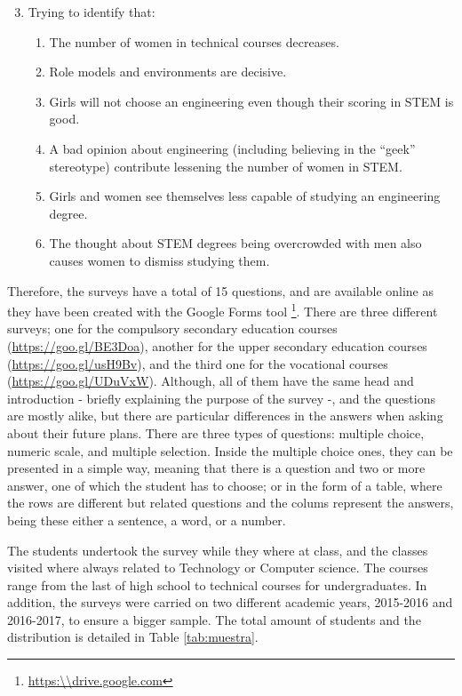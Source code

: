 \documentclass[journal,transmag]{IEEEtran}
\begin{document}
\begin{enumerate}
  \setcounter{enumi}{2}
  \item Trying to identify that:
  \begin{enumerate}
  \item The number of women in technical courses decreases.
  \item Role models and environments are decisive.
  \item Girls will not choose an engineering even though their scoring in STEM is good.
  \item A bad opinion about engineering (including believing in the ``geek'' stereotype) contribute lessening the number of women in STEM.
  \item Girls and women see themselves less capable of studying an engineering degree.
  \item The thought about STEM degrees being overcrowded with men also causes women to dismiss studying them.
  \end{enumerate}
\end{enumerate}

Therefore, the surveys have a total of 15 questions, and are available online as they have been created with the Google Forms tool \footnote{\url{https:\\drive.google.com}}. There are three different surveys; one for the compulsory secondary education courses (\url{https://goo.gl/BE3Doa}), another for the upper secondary education courses (\url{https://goo.gl/usH9Bv}), and the third one for the vocational courses (\url{https://goo.gl/UDuVxW}). Although, all of them have the same head and introduction - briefly explaining the purpose of the survey -\cite{cohen2013research}, and the questions are mostly alike, but there are particular differences in the answers when asking about their future plans. There are three types of questions: multiple choice, numeric scale, and multiple selection. Inside the multiple choice ones, they can be presented in a simple way, meaning that there is a question and two or more answer, one of which the student has to choose; or in the form of a table, where the rows are different but related questions and the colums represent the answers, being these either a sentence, a word, or a number.

The students undertook the survey while they where at class, and the classes visited where always related to Technology or Computer science. The courses range from the last of high school to technical courses for undergraduates. In addition, the surveys were carried on two different academic years, 2015-2016 and 2016-2017, to ensure a bigger sample. The total amount of students and the distribution is detailed in Table \ref{tab:muestra}.
\end{document}
